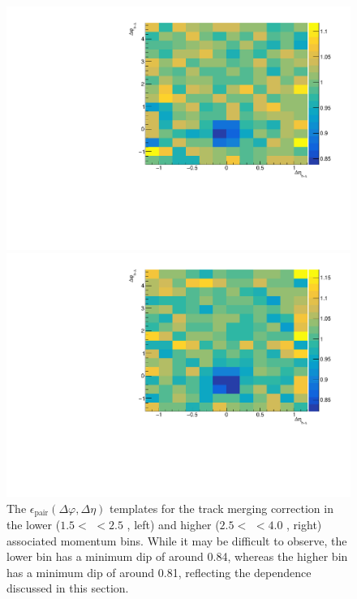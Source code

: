 \begin{figure}[ht]
	\centering
	\begin{minipage}{0.48\textwidth}
		\includegraphics[width=\textwidth]{figures/analysis/twotrack_template_lowpt.pdf}
	\end{minipage}
	\begin{minipage}{0.48\textwidth}
		\includegraphics[width=\textwidth]{figures/analysis/twotrack_template_highpt.pdf}
	\end{minipage}
	\caption{The $\epsilon_{\text{pair}}(\Delta\varphi, \Delta\eta)$ templates for the track merging correction in the lower ($1.5 <$ \pt $< 2.5$ \GeVc, left)  and higher ($2.5 <$ \pt $< 4.0$ \GeVc, right) associated momentum bins. While it may be difficult to observe, the lower \pt bin has a minimum dip of around 0.84, whereas the higher \pt bin has a minimum dip of around 0.81, reflecting the \pt dependence discussed in this section.}
	\label{fig:pair_efficiency_template}
\end{figure}

